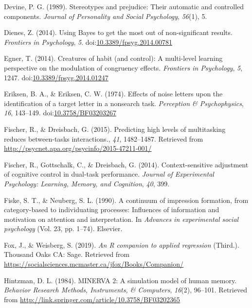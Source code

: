 \documentclass[english,,man,floatsintext]{apa6}
\begin{document}
\leavevmode\hypertarget{ref-devine_stereotypes_1989}{}%
Devine, P. G. (1989). Stereotypes and prejudice: Their automatic and controlled components. \emph{Journal of Personality and Social Psychology}, \emph{56}(1), 5.

\leavevmode\hypertarget{ref-dienes_using_2014}{}%
Dienes, Z. (2014). Using Bayes to get the most out of non-significant results. \emph{Frontiers in Psychology}, \emph{5}. doi:\href{https://doi.org/10.3389/fpsyg.2014.00781}{10.3389/fpsyg.2014.00781}

\leavevmode\hypertarget{ref-egner_creatures_2014}{}%
Egner, T. (2014). Creatures of habit (and control): A multi-level learning perspective on the modulation of congruency effects. \emph{Frontiers in Psychology}, \emph{5}, 1247. doi:\href{https://doi.org/10.3389/fpsyg.2014.01247}{10.3389/fpsyg.2014.01247}

\leavevmode\hypertarget{ref-eriksen_effects_1974}{}%
Eriksen, B. A., \& Eriksen, C. W. (1974). Effects of noise letters upon the identification of a target letter in a nonsearch task. \emph{Perception \& Psychophysics}, \emph{16}, 143--149. doi:\href{https://doi.org/10.3758/BF03203267}{10.3758/BF03203267}

\leavevmode\hypertarget{ref-fischer_predicting_2015}{}%
Fischer, R., \& Dreisbach, G. (2015). Predicting high levels of multitasking reduces between-tasks interactions., \emph{41}, 1482--1487. Retrieved from \url{http://psycnet.apa.org/psycinfo/2015-47211-001/}

\leavevmode\hypertarget{ref-fischer_context-sensitive_2014}{}%
Fischer, R., Gottschalk, C., \& Dreisbach, G. (2014). Context-sensitive adjustment of cognitive control in dual-task performance. \emph{Journal of Experimental Psychology: Learning, Memory, and Cognition}, \emph{40}, 399.

\leavevmode\hypertarget{ref-fiske_continuum_1990}{}%
Fiske, S. T., \& Neuberg, S. L. (1990). A continuum of impression formation, from category-based to individuating processes: Influences of information and motivation on attention and interpretation. In \emph{Advances in experimental social psychology} (Vol. 23, pp. 1--74). Elsevier.

\leavevmode\hypertarget{ref-r_car_2019}{}%
Fox, J., \& Weisberg, S. (2019). \emph{An R companion to applied regression} (Third.). Thousand Oaks CA: Sage. Retrieved from \url{https://socialsciences.mcmaster.ca/jfox/Books/Companion/}

\leavevmode\hypertarget{ref-hintzman_minerva_1984}{}%
Hintzman, D. L. (1984). MINERVA 2: A simulation model of human memory. \emph{Behavior Research Methods, Instruments, \& Computers}, \emph{16}(2), 96--101. Retrieved from \url{http://link.springer.com/article/10.3758/BF03202365}
\end{document}
